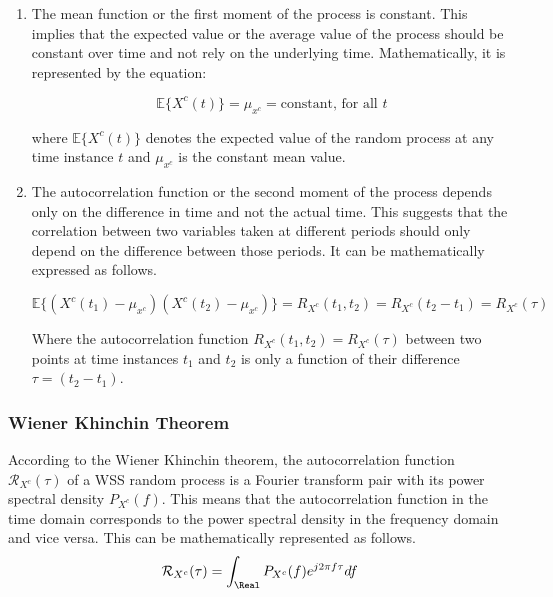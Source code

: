 \begin{enumerate}
    \item The mean function or the first moment of the process is constant. This implies that the expected value or the average value of the process should be constant over time and not rely on the underlying time. Mathematically, it is represented by the equation:

    \begin{equation}
        \mathbb{E}\{X^{c}(t)\} = \mu_{x^{c}} = \text{constant, for all } t
    \end{equation}

    where $\mathbb{E}\{X^{c}(t)\}$ denotes the expected value of the random process at any time instance $t$ and $\mu_{x^{c}}$ is the constant mean value.

    \item The autocorrelation function or the second moment of the process depends only on the difference in time and not the actual time. This suggests that the correlation between two variables taken at different periods should only depend on the difference between those periods. It can be mathematically expressed as follows.

    \begin{equation}
        \mathbb{E}\{(X^{c}(t_1)-\mu_{x^{c}})(X^{c}(t_2)-\mu_{x^{c}})\} = R_{X^{c}}(t_1,t_2) = R_{X^{c}}(t_2-t_1) = R_{X^{c}}(\tau)
    \end{equation}
    
    Where the autocorrelation function $R_{X^{c}}(t_1,t_2) = R_{X^{c}}(\tau)$ between two points at time instances $t_1$ and $t_2$ is only a function of their difference $\tau=(t_2 - t_1)$. 
\end{enumerate}

\subsubsection{Wiener Khinchin Theorem}

According to the Wiener Khinchin theorem, the autocorrelation function $\mathcal{R}_{X^c}(\tau)$ of a WSS random process is a Fourier transform pair with its power spectral density $P_{X^c}(f)$. This means that the autocorrelation function in the time domain corresponds to the power spectral density in the frequency domain and vice versa. This can be mathematically represented as follows.
\begin{equation}
    \mathcal{R}_{X^c}(\tau) = \int_{\Real} P_{X^c}(f) e^{j 2\pi f \tau} df
\end{equation}

